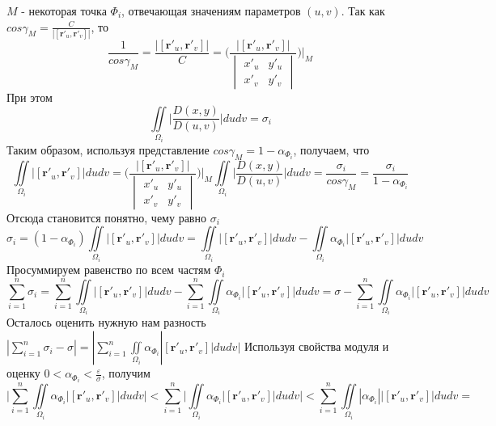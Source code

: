 \documentclass[12pt,a4paper]{article}
\begin{document}
	$M$ - некоторая точка $\Phi_{i}$, отвечающая значениям параметров $(u,v)$.
	\newline
	Так как $cos\gamma_{M} = \frac{C}{|\left[ \textbf{r}'_{u}, \textbf{r}'_{v} \right]|}$, то 
	\[\frac{1}{cos\gamma_{M}} = \frac{|\left[ \textbf{r}'_{u}, \textbf{r}'_{v} \right]|}{C} = 
	\bigg( \frac{|\left[ \textbf{r}'_{u}, \textbf{r}'_{v} \right]|}
	{
		\begin{vmatrix}
			x'_{u} & y'_{u}\\
			x'_{v} & y'_{v}
		\end{vmatrix}
	}\bigg) \bigg|_M
	\]
	При этом
	\[
	\iint\limits_{\Omega_{i}} \bigg| \frac{D(x,y)}{D(u,v)} \bigg| dudv = \sigma_{i}
	\]
	Таким образом, используя представление $cos\gamma_{M} = 1 - \alpha_{\Phi_{i}}$, получаем, что
	\[
		\iint\limits_{\Omega_{i}} | \left[ \textbf{r}'_{u}, \textbf{r}'_{v} \right] | dudv =
		\bigg(\frac{| \left[ \textbf{r}'_{u}, \textbf{r}'_{v} \right] |}{
			\begin{vmatrix}
				x'_{u} & y'_{u}\\
				x'_{v} & y'_{v}
			\end{vmatrix}
		}\bigg)\bigg|_M
		\iint\limits_{\Omega_{i}} \bigg| \frac{D(x,y)}{D(u,v)} \bigg| dudv	=
		\frac{\sigma_{i}}{cos\gamma_{M}} = \frac{\sigma_{i}}{1 - \alpha_{\Phi_{i}}}
	\]
	Отсюда становится понятно, чему равно $\sigma_{i}$
	\[
		\sigma_{i} = (1 - \alpha_{\Phi_{i}}) \iint\limits_{\Omega_{i}} | \left[ \textbf{r}'_{u}, \textbf{r}'_{v} \right] | dudv = \iint\limits_{\Omega_{i}} | \left[ \textbf{r}'_{u}, \textbf{r}'_{v} \right] | dudv - \iint\limits_{\Omega_{i}} \alpha_{\Phi_{i}} | \left[ \textbf{r}'_{u}, \textbf{r}'_{v} \right] | dudv
	\]
	Просуммируем равенство по всем частям $\Phi_{i}$
	\[
		\sum\limits_{i=1}^n \sigma_{i} = \sum\limits_{i=1}^n \iint\limits_{\Omega_{i}} | \left[ \textbf{r}'_{u}, \textbf{r}'_{v} \right] | dudv - \sum\limits_{i=1}^n \iint\limits_{\Omega_{i}} \alpha_{\Phi_{i}} | \left[ \textbf{r}'_{u}, \textbf{r}'_{v} \right] | dudv =
		\sigma - \sum\limits_{i=1}^n \iint\limits_{\Omega_{i}} \alpha_{\Phi_{i}} | \left[ \textbf{r}'_{u}, \textbf{r}'_{v} \right] | dudv
	\]
	Осталось оценить нужную нам разность $|\sum\limits_{i=1}^n \sigma_{i} - \sigma| = |\sum\limits_{i=1}^n \iint\limits_{\Omega_{i}} \alpha_{\Phi_{i}} | \left[ \textbf{r}'_{u}, \textbf{r}'_{v} \right] | dudv|$
	\newline
	Используя свойства модуля и оценку $0 < \alpha_{\Phi_{i}} < \frac{\varepsilon}{\sigma}$, получим
	\[
		\bigg|\sum\limits_{i=1}^n \iint\limits_{\Omega_{i}} \alpha_{\Phi_{i}} | \left[ \textbf{r}'_{u}, \textbf{r}'_{v} \right] | dudv \bigg| < 
		\sum\limits_{i=1}^n \bigg| \iint\limits_{\Omega_{i}} \alpha_{\Phi_{i}} | \left[ \textbf{r}'_{u}, \textbf{r}'_{v} \right] | dudv \bigg| 
		< \sum\limits_{i=1}^n \iint\limits_{\Omega_{i}} |\alpha_{\Phi_{i}}||  \left[ \textbf{r}'_{u}, \textbf{r}'_{v} \right] | dudv = 
	\] 
\end{document}
